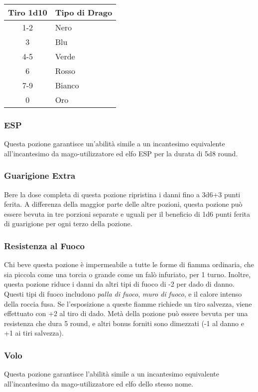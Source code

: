 \documentclass{article}
\begin{document}
\begin{multicols}{2}
\begin{table}[h]
\centering
\begin{tabular}{|c|l|}
\hline
\textbf{Tiro 1d10} & \textbf{Tipo di Drago} \\
\hline
1-2 & Nero \\
3 & Blu \\
4-5 & Verde \\
6 & Rosso \\
7-9 & Bianco \\
0 & Oro \\
\hline
\end{tabular}

\end{table}

\subsubsection{ESP}
Questa pozione garantisce un'abilità simile a un incantesimo equivalente all'incantesimo da mago-utilizzatore ed elfo ESP per la durata di 5d8 round.

\subsubsection{Guarigione Extra}
Bere la dose completa di questa pozione ripristina i danni fino a 3d6+3 punti ferita. A differenza della maggior parte delle altre pozioni, questa pozione può essere bevuta in tre porzioni separate e uguali per il beneficio di 1d6 punti ferita di guarigione per ogni terzo della pozione.

\subsubsection{Resistenza al Fuoco}
Chi beve questa pozione è impermeabile a tutte le forme di fiamma ordinaria, che sia piccola come una torcia o grande come un falò infuriato, per 1 turno. Inoltre, questa pozione riduce i danni da altri tipi di fuoco di -2 per dado di danno. Questi tipi di fuoco includono \textit{palla di fuoco}, \textit{muro di fuoco}, e il calore intenso della roccia fusa. Se l'esposizione a queste fiamme richiede un tiro salvezza, viene effettuato con +2 al tiro di dado. Metà della pozione può essere bevuta per una resistenza che dura 5 round, e altri bonus forniti sono dimezzati (-1 al danno e +1 ai tiri salvezza).

\subsubsection{Volo}
Questa pozione garantisce l'abilità simile a un incantesimo equivalente all'incantesimo da mago-utilizzatore ed elfo dello stesso nome.


\end{multicols}
\end{document}

